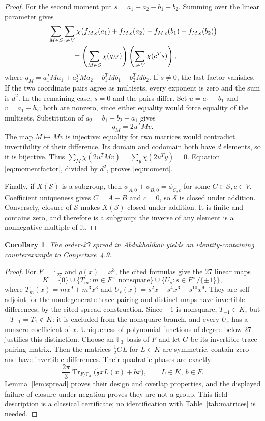 \documentclass[11pt]{article}
\newtheorem{corollary}[theorem]{Corollary}
\newcommand{\F}{\mathbb F}
\newcommand{\Sset}{\mathcal S}
\begin{document}
\begin{proof}
For the second moment put $s=a_1+a_2-b_1-b_2$. Summing over the linear parameter gives
\begin{align}\label{eq:momentfactor}
&\sum_{M\in\Sset}\sum_{c\in V}
 \chi\bigl(f_{M,c}(a_1)+f_{M,c}(a_2)-f_{M,c}(b_1)-f_{M,c}(b_2)\bigr)\\
&\hspace{12mm}=\left(\sum_{M\in\Sset}\chi(q_M)\right)
\left(\sum_{c\in V}\chi(c^Ts)\right),\nonumber
\end{align}
where $q_M=a_1^TMa_1+a_2^TMa_2-b_1^TMb_1-b_2^TMb_2$.
If $s\ne0$, the last factor vanishes. If the two coordinate pairs agree as multisets, every exponent is zero and the sum is $d^2$. In the remaining case, $s=0$ and the pairs differ. Set $u=a_1-b_1$ and $v=a_1-b_2$; both are nonzero, since either equality would force equality of the multisets. Substitution of $a_2=b_1+b_2-a_1$ gives
\[
q_M=2u^TMv.
\]
The map $M\mapsto Mv$ is injective: equality for two matrices would contradict invertibility of their difference. Its domain and codomain both have $d$ elements, so it is bijective. Thus $\sum_M\chi(2u^TMv)=\sum_y\chi(2u^Ty)=0$. Equation \eqref{eq:momentfactor}, divided by $d^2$, proves \eqref{eq:moment}.

Finally, if $X(\Sset)$ is a subgroup, then $\phi_{A,0}+\phi_{B,0}=\phi_{C,c}$ for some $C\in\Sset,c\in V$. Coefficient uniqueness gives $C=A+B$ and $c=0$, so $\Sset$ is closed under addition. Conversely, closure of $\Sset$ makes $X(\Sset)$ closed under addition. It is finite and contains zero, and therefore is a subgroup: the inverse of any element is a nonnegative multiple of it.
\end{proof}

\begin{corollary}\label{cor:classical}
The order-27 spread in Abdukhalikov \cite[Section~3.3, Corollary~3.7]{abdu} yields an identity-containing counterexample to Conjecture~4.9.
\end{corollary}
\begin{proof}
For $F=\F_{27}$ and $\rho(x)=x^3$, the cited formulas give the 27 linear maps
\[
K=\{0\}\cup\{T_m:m\in F^\times\text{ nonsquare}\}
\cup\{U_s:s\in F^\times/\{\pm1\}\},
\]
where $T_m(x)=mx^9+m^3x^3$ and $U_s(x)=s^2x-s^4x^3-s^{10}x^9$. They are self-adjoint for the nondegenerate trace pairing and distinct maps have invertible differences, by the cited spread construction. Since $-1$ is nonsquare, $T_{-1}\in K$, but $-T_{-1}=T_1\notin K$: it is excluded from the nonsquare branch, and every $U_s$ has a nonzero coefficient of $x$. Uniqueness of polynomial functions of degree below 27 justifies this distinction. Choose an $\F_3$-basis of $F$ and let $G$ be its invertible trace-pairing matrix. Then the matrices $\tfrac12 GL$ for $L\in K$ are symmetric, contain zero and have invertible differences. Their quadratic phases are exactly
\[
\frac{2\pi}{3}\operatorname{Tr}_{F/\F_3}\bigl(\tfrac12xL(x)+bx\bigr),\qquad L\in K,\ b\in F.
\]
Lemma~\ref{lem:spread} proves their design and overlap properties, and the displayed failure of closure under negation proves they are not a group. This field description is a classical certificate; no identification with Table~\ref{tab:matrices} is needed.
\end{proof}
\end{document}
